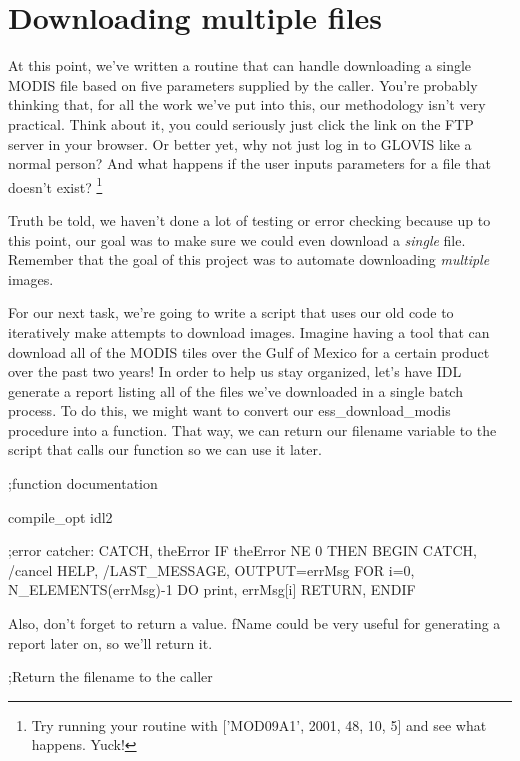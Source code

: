 \documentclass{book}
\newcommand{\codefill}{\centering$\longrightarrow$\hfill{\color{gray}\rule[0.1\baselineskip]{0.5\linewidth}{2pt}}\hfill$\longleftarrow$}
\newcounter{highlight}[page]
\newcommand{\tikzhighlightanchor}[1]{\ensuremath{\vcenter{\hbox{\tikz[remember picture, overlay]{\coordinate (#1 highlight \arabic{highlight});}}}}}
\newcommand{\bh}[0]{\stepcounter{highlight}\tikzhighlightanchor{begin}}
\newcommand{\eh}[0]{\tikzhighlightanchor{end}}
\theoremstyle{aside_style}
\begin{document}
\section{Downloading multiple files}

At this point, we've written a routine that can handle downloading a single MODIS file based on five parameters supplied by the caller.
You're probably thinking that, for all the work we've put into this, our methodology isn't very practical.
Think about it, you could seriously just click the link on the FTP server in your browser.
Or better yet, why not just log in to GLOVIS like a normal person?
And what happens if the user inputs parameters for a file that doesn't exist?
\footnote{Try running your routine with ['MOD09A1', 2001, 48, 10, 5] and see what happens. Yuck!}

Truth be told, we haven't done a lot of testing or error checking because up to this point, 
our goal was to make sure we could even download a \textit{single} file. 
Remember that the goal of this project was to automate downloading \textit{multiple} images.

For our next task, we're going to write a script that uses our old code to iteratively make attempts to download images.
Imagine having a tool that can download all of the MODIS tiles over the Gulf of Mexico for a certain product over the past two years!
In order to help us stay organized, let's have IDL generate a report listing all of the files we've downloaded in a single batch process.
To do this, we might want to convert our ess\_download\_modis procedure into a function.
That way, we can return our filename variable to the script that calls our function so we can use it later.

\begin{idl}
;function documentation

compile_opt idl2

;error catcher:
CATCH, theError
IF theError NE 0 THEN BEGIN
  CATCH, /cancel
  HELP, /LAST_MESSAGE, OUTPUT=errMsg
  FOR i=0, N_ELEMENTS(errMsg)-1 DO print, errMsg[i]
  RETURN,%
ENDIF
\end{idl}

Also, don't forget to return a value. fName could be very useful for generating a report later on, so we'll return it.

\begin{idl}
;Return the filename to the caller
\end{idl}
\end{document}
